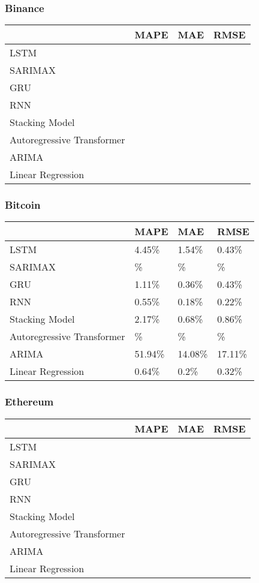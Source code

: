 \documentclass{ieeeojies}
\begin{document}
\subsubsection{Binance}
\begin{center}
\begin{tabular}{|p{2cm}|p{1.8cm}|p{1.8cm}|p{1.8cm}|}
\hline
&\textbf{MAPE} & \textbf{MAE} & \textbf{RMSE} \\
\hline
LSTM  & & &\\
\hline
SARIMAX & & &\\
\hline
GRU & & &\\
\hline
RNN & & &\\
\hline
Stacking Model & & &\\
\hline
Autoregressive Transformer & & &\\
\hline
ARIMA & & &\\
\hline
Linear Regression &  &  & \\
\hline
\end{tabular}
\end{center}
\subsubsection{Bitcoin}
\begin{center}
\begin{tabular}{|p{2cm}|p{1.8cm}|p{1.8cm}|p{1.8cm}|}
\hline
&\textbf{MAPE} & \textbf{MAE} & \textbf{RMSE} \\
\hline
LSTM  & 4.45\%& 1.54\%&0.43\%\\
\hline
SARIMAX & \%& \%&\%\\
\hline
GRU & 1.11\%& 0.36\%& 0.43\%\\
\hline
RNN &  0.55\%& 0.18\% & 0.22\%\\
\hline
Stacking Model & 2.17\% & 0.68\% & 0.86\%\\ 
\hline
Autoregressive Transformer & \% & \% & \%\\
\hline
ARIMA & 51.94\% & 14.08\%  & 17.11\%\\
\hline
Linear Regression & 0.64\% & 0.2\% & 0.32\%\\
\hline
\end{tabular}
\end{center}
\subsubsection{Ethereum}
\begin{center}
\begin{tabular}{|p{2cm}|p{1.8cm}|p{1.8cm}|p{1.8cm}|}
\hline
&\textbf{MAPE} & \textbf{MAE} & \textbf{RMSE} \\
\hline
LSTM  & & &\\
\hline
SARIMAX & & &\\
\hline
GRU & & &\\
\hline
RNN & & &\\
\hline
Stacking Model & & &\\ 
\hline
Autoregressive Transformer & & &\\
\hline
ARIMA & & &\\
\hline
Linear Regression & & &\\
\hline
\end{tabular}
\end{center}
\end{document}

